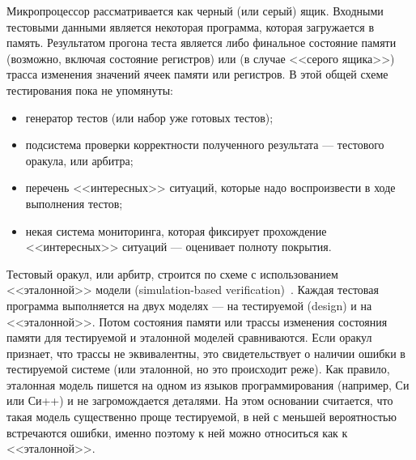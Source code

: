 \documentclass[14pt]{extreport}
\begin{document}
Микропроцессор рассматривается как черный (или серый) ящик. Входными тестовыми данными является некоторая программа, которая загружается в память. Результатом прогона теста является либо финальное состояние памяти (возможно, включая состояние регистров) или (в случае <<серого ящика>>) трасса изменения значений ячеек памяти или регистров.
В этой общей схеме тестирования пока не упомянуты:
\begin{itemize}
	\item	генератор тестов (или набор уже готовых тестов);
	\item	подсистема проверки корректности полученного результата --- тестового оракула, или арбитра;
	\item	перечень <<интересных>> ситуаций, которые надо воспроизвести в ходе выполнения тестов;
	\item	некая система мониторинга, которая фиксирует прохождение <<интересных>> ситуаций --- оценивает полноту покрытия.
\end{itemize}

Тестовый оракул, или арбитр, строится по схеме с использованием <<эталонной>> модели (simulation-based verification)~\cite{SimulationBased}. Каждая тестовая программа выполняется на двух моделях --- на тестируемой (design) и на <<эталонной>>. Потом состояния памяти или трассы изменения состояния памяти для тестируемой и эталонной моделей сравниваются. Если оракул признает, что трассы не эквивалентны, это свидетельствует о наличии ошибки в тестируемой системе (или эталонной, но это происходит реже). Как правило, эталонная модель пишется на одном из языков программирования (например, Си или Си++) и не загромождается деталями.  На этом основании считается, что такая модель существенно проще тестируемой, в ней с меньшей вероятностью встречаются ошибки, именно поэтому к ней можно относиться как к <<эталонной>>.

\end{document}
